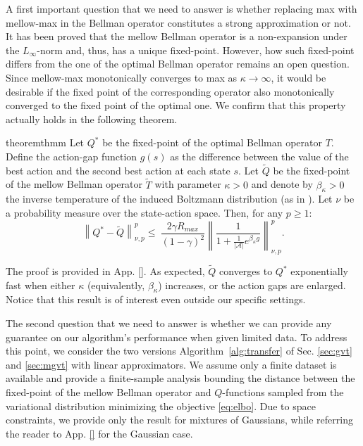 \documentclass{article}
\newcommand{\wt}[1]{\widetilde{#1}}
\newcommand{\norm}[1]{\left\lVert #1 \right\rVert}
\newcommand{\abs}[1]{\left\lvert #1 \right\rvert}
\begin{document}
A first important question that we need to answer is whether replacing max with mellow-max in the Bellman operator constitutes a strong approximation or not. It has been proved \cite{asadi2017alternative} that the mellow Bellman operator is a non-expansion under the $L_{\infty}$-norm and, thus, has a unique fixed-point.  However, how such fixed-point differs from the one of the optimal Bellman operator remains an open question. Since mellow-max monotonically converges to max as $\kappa \rightarrow \infty$, it would be desirable if the fixed point of the corresponding operator also monotonically converged to the fixed point of the optimal one. We confirm that this property actually holds in the following theorem.

\begin{restatable}{theorem}{thmm} \label{th:mm}
Let $Q^*$ be the fixed-point of the optimal Bellman operator $T$. Define the action-gap function $g(s)$ as the difference between the value of the best action and the second best action at each state $s$. Let $\wt{Q}$ be the fixed-point of the mellow Bellman operator $\wt{T}$ with parameter $\kappa > 0$ and denote by $\beta_{\kappa} > 0$ the inverse temperature of the induced Boltzmann distribution (as in \cite{asadi2017alternative}). Let $\nu$ be a probability measure over the state-action space. Then, for any $p \geq 1$:
\begin{equation}
\norm{Q^*-\wt{Q}}_{\nu,p}^p \leq\ \frac{2\gamma R_{max}}{(1-\gamma)^2}\norm{\frac{1}{1 + \frac{1}{\abs{\mathcal{A}}}e^{\beta_{\kappa} g}}}_{\nu,p}^p.
\end{equation}
\end{restatable}

The proof is provided in App. \ref{}. As expected, $\wt{Q}$ converges to $Q^*$ exponentially fast when either $\kappa$ (equivalently, $\beta_{\kappa}$) increases, or the action gaps are enlarged. Notice that this result is of interest even outside our specific settings.

The second question that we need to answer is whether we can provide any guarantee on our algorithm's performance when given limited data. To address this point, we consider the two versions Algorithm~\ref{alg:transfer} of Sec. \ref{sec:gvt} and \ref{sec:mgvt} with linear approximators. We assume only a finite dataset is available and provide a finite-sample analysis bounding the distance between the fixed-point of the mellow Bellman operator and $Q$-functions sampled from the variational distribution minimizing the objective \eqref{eq:elbo}. Due to space constraints, we provide only the result for mixtures of Gaussians, while referring the reader to App. \ref{} for the Gaussian case.
\end{document}
